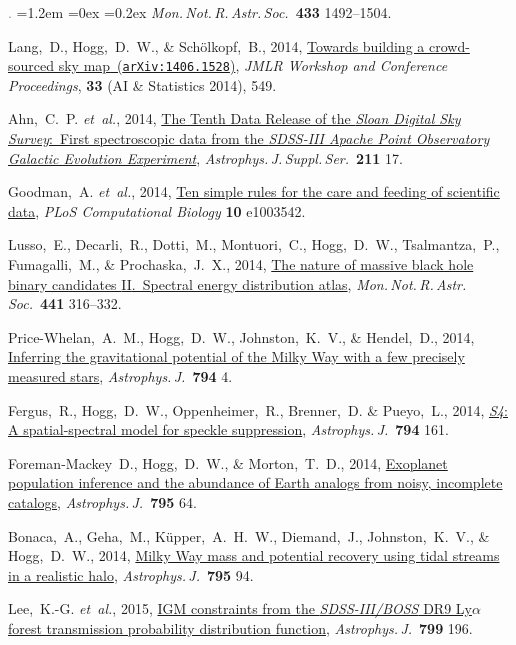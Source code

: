 \documentclass[10pt,letterpaper]{article}
\newcommand{\acronym}[1]{{\small{#1}}}
\newcommand{\foreign}[1]{\textsl{#1}}
\newcommand{\etal}{\foreign{et~al.}}
\newcommand{\project}[1]{\textsl{#1}}
\newcommand{\doi}[2]{\href{http://dx.doi.org/#1}{{#2}}}
\newcommand{\arxiv}[2]{\href{http://arxiv.org/abs/#1}{{#2}\ (\texttt{arXiv:#1})}}
\newcommand{\deemph}[1]{\textcolor{grey}{\footnotesize{#1}}}
\newcommand{\pubnumber}[1]{\deemph{{#1}.}}
\newcounter{refpubnum}
\newcommand{\hogglist}{%
    \rightmargin=0in
    \leftmargin=1.2em
    \topsep=0ex
    \partopsep=0pt
    \itemsep=0.2ex
    \parsep=0pt
    \itemindent=-1.0\leftmargin
    \listparindent=0.0\leftmargin
    \settowidth{\labelsep}{~}
    \usecounter{refpubnum}
  }
\begin{document}
\begin{list}{\pubnumber{\therefpubnum}}{\hogglist}
\textit{Mon.\,Not.\,R.\,Astr.\,Soc.}\ \textbf{433} 1492--1504.
\item
Lang,~D., Hogg,~D.~W., \& Sch\"olkopf,~B., 2014,
\arxiv{1406.1528}{Towards building a crowd-sourced sky map},
\textit{JMLR Workshop and Conference Proceedings}, \textbf{33} (AI \& Statistics 2014), 549.
\item
Ahn,~C.~P. \etal, 2014,
\doi{10.1088/0067-0049/211/2/17}{The Tenth Data Release of the \project{Sloan Digital Sky Survey}:\ First spectroscopic data from the \project{\acronym{SDSS-III} Apache Point Observatory Galactic Evolution Experiment}},
\textit{Astrophys.\,J.\,Suppl.\,Ser.}\ \textbf{211} 17.
\item
Goodman,~A. \etal, 2014,
\doi{10.1371/journal.pcbi.1003542}{Ten simple rules for the care and feeding of scientific data},
\textit{PLoS Computational Biology} \textbf{10} e1003542.
\item
Lusso,~E., Decarli,~R., Dotti,~M., Montuori,~C., Hogg,~D.~W.,
Tsalmantza,~P., Fumagalli,~M., \& Prochaska,~J.~X., 2014,
\doi{10.1093/mnras/stu572}{The nature of massive black hole binary candidates \acronym{II}.\ Spectral energy distribution atlas},
\textit{Mon.\,Not.\,R.\,Astr.\,Soc.}\ \textbf{441} 316--332.
\item
Price-Whelan,~A.~M., Hogg,~D.~W., Johnston,~K.~V., \& Hendel,~D., 2014,
\doi{10.1088/0004-637X/794/1/4}{Inferring the gravitational potential of the Milky Way with a few precisely measured stars},
\textit{Astrophys.\,J.}\ \textbf{794} 4.
\item
Fergus,~R., Hogg,~D.~W., Oppenheimer,~R., Brenner,~D. \& Pueyo,~L., 2014,
\doi{10.1088/0004-637X/794/2/161}{\project{S4}: A spatial-spectral model for speckle suppression},
\textit{Astrophys.\,J.}\ \textbf{794} 161.
\item
Foreman-Mackey~D., Hogg,~D.~W., \& Morton,~T.~D., 2014,
\doi{10.1088/0004-637X/795/1/64}{Exoplanet population inference and the abundance of Earth analogs from noisy, incomplete catalogs},
\textit{Astrophys.\,J.}\ \textbf{795} 64.
\item
Bonaca,~A., Geha,~M., K\"upper,~A.~H.~W., Diemand,~J., Johnston,~K.~V., \& Hogg,~D.~W., 2014,
\doi{10.1088/0004-637X/795/1/94}{Milky Way mass and potential recovery using tidal streams in a realistic halo},
\textit{Astrophys.\,J.}\ \textbf{795} 94.
\item 
Lee,~K.-G. \etal, 2015,
\doi{10.1088/0004-637X/799/2/196}{IGM constraints from the \project{\acronym{SDSS-III/BOSS}}
DR9 Ly{$\alpha$} forest transmission probability distribution function},
\textit{Astrophys.\,J.}\ \textbf{799} 196.

\end{list}
\end{document}
